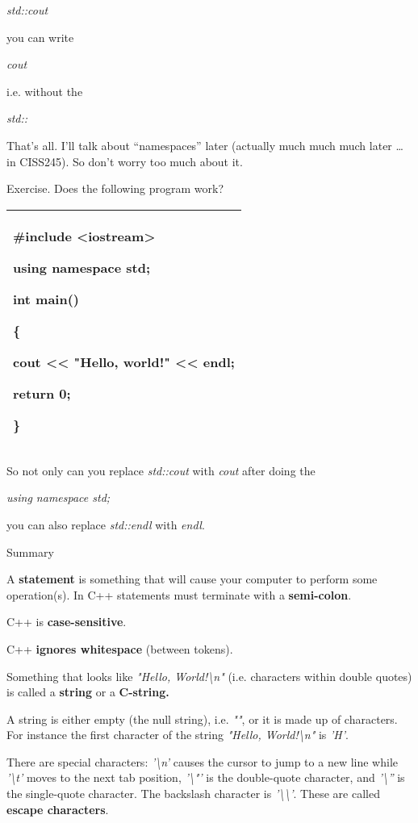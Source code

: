 \documentclass[
]{article}
\begin{document}
\emph{std::cout}

you can write

\emph{cout}

i.e. without the

\emph{std::}

That's all. I'll talk about ``namespaces'' later (actually much much
much later \ldots{} in CISS245). So don't worry too much about it.

Exercise. Does the following program work?

\begin{longtable}[]{@{}l@{}}
\toprule
\endhead
\begin{minipage}[t]{0.97\columnwidth}\raggedright
\#include \textless iostream\textgreater{}

using namespace std;

int main()

\{

cout \textless\textless{} "Hello, world!" \textless\textless{} endl;

return 0;

\}\strut
\end{minipage}\tabularnewline
\bottomrule
\end{longtable}

So not only can you replace \emph{std::cout} with \emph{cout} after
doing the

\emph{using namespace std;}

you can also replace \emph{std::endl} with \emph{endl}.

Summary

A \textbf{statement} is something that will cause your computer to
perform some operation(s). In C++ statements must terminate with a
\textbf{semi-colon}.

C++ is \textbf{case-sensitive}.

C++ \textbf{ignores whitespace} (between tokens).

Something that looks like \emph{"Hello, World!\textbackslash n"} (i.e.
characters within double quotes) is called a \textbf{string} or a
\textbf{C-string.}

A string is either empty (the null string), i.e. \emph{""}, or it is
made up of characters. For instance the first character of the string
\emph{"Hello, World!\textbackslash n"} is \emph{'H'}.

There are special characters: \emph{'\textbackslash n'} causes the
cursor to jump to a new line while \emph{'\textbackslash t'} moves to
the next tab position, \emph{'\textbackslash"'} is the double-quote
character, and \emph{'\textbackslash''} is the single-quote character.
The backslash character is \emph{'\textbackslash\textbackslash'}. These
are called \textbf{escape characters}.
\end{document}
